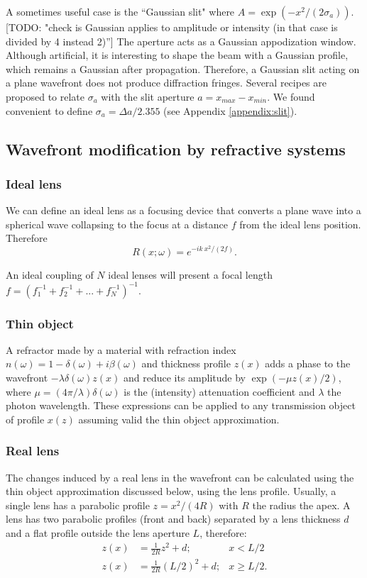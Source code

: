 \documentclass{iucr}              %
\newcommand{\todo}[1]{{\color{red}[TODO: "#1'']}}
\begin{document}
A sometimes useful case is the ``Gaussian slit" where $A=\exp(-x^2/(2\sigma_a))$. \todo{check is Gaussian applies to amplitude or intensity (in that case is divided by 4 instead 2)} The aperture acts as a Gaussian appodization window. Although artificial, it is interesting to shape the beam with a Gaussian profile, which remains a Gaussian after propagation. Therefore, a Gaussian slit acting on a plane wavefront does not produce diffraction fringes. Several recipes are proposed to relate $\sigma_a$ with the slit aperture $a=x_{max}-x_{min}$. We found convenient to define $\sigma_a=\Delta a/2.355$ (see Appendix \ref{appendix:slit}).

\subsection{Wavefront modification by refractive systems}

\subsubsection{Ideal lens}
We can define an ideal lens as a focusing device that converts a plane wave into a spherical wave collapsing to the focus at a distance $f$ from the ideal lens position. Therefore
\begin{equation}
    R(x;\omega) = e^{-i k~x^2/(2 f)}.
\end{equation}

An ideal coupling of $N$ ideal lenses will present a focal length $f=(f_1^{-1}+f_2^{-1}+...+f_N^{-1})^{-1}$. 

\subsubsection{Thin object} A refractor made by a material with refraction index $n(\omega)=1-\delta(\omega)+i\beta(\omega)$ 
and thickness profile $z(x)$ adds a phase to the wavefront $-\lambda \delta(\omega) z(x)$ and reduce its amplitude by $\exp(-\mu z(x)/2)$, where $\mu=(4 \pi/\lambda) \delta(\omega)$ is the (intensity) attenuation coefficient and $\lambda$ the photon wavelength. These expressions can be applied to any transmission object of profile $x(z)$ assuming valid the thin object approximation. 


\subsubsection{Real lens} The changes induced by a real lens in the wavefront can be calculated using the thin object approximation discussed below, using the lens profile. Usually, a single lens has a parabolic profile $z=x^2/(4R)$ with $R$ the radius the apex. A lens has two parabolic profiles (front and back) separated by a lens thickness $d$ and a flat profile outside the lens aperture $L$, therefore:
\begin{align}
    z(x) &= \frac{1}{2R} z^2 + d; & x < L/2\\ \nonumber
    z(x) &= \frac{1}{2R} (L/2)^2 + d; & x \ge L/2.
\end{align}
\end{document}
